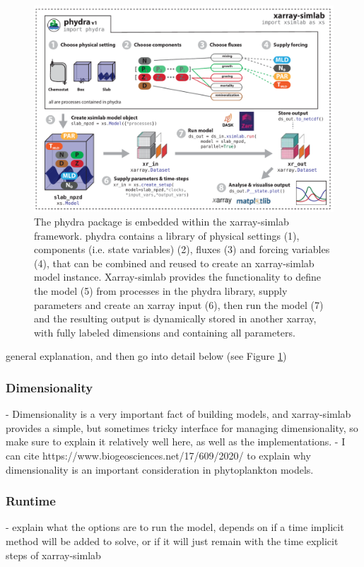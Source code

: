 \documentclass[template.tex]{subfiles}
\begin{document}
%
\begin{figure}[t]
\includegraphics[width=12cm]{Figures/firstdraft_schematics/01__schematics_phydra_1.pdf}
\caption{The phydra package is embedded within the xarray-simlab framework. phydra contains a library of physical settings (1), components (i.e. state variables) (2), fluxes (3) and forcing variables (4), that can be combined and reused to create an xarray-simlab model instance. Xarray-simlab provides the functionality to define the model (5) from processes in the phydra library, supply parameters and create an xarray input (6), then run the model (7) and the resulting output is dynamically stored in another xarray, with fully labeled dimensions and containing all parameters.}
\label{phydraschematics}
\end{figure}

general explanation, and then go into detail below (see Figure \ref{phydraschematics})

\subsubsection{Dimensionality}
- Dimensionality is a very important fact of building models, and xarray-simlab provides a simple, but sometimes tricky interface for managing dimensionality, so make sure to explain it relatively well here, as well as the implementations.
- I can cite https://www.biogeosciences.net/17/609/2020/ to explain why dimensionality is an important consideration in phytoplankton models.

\subsubsection{Runtime}
- explain what the options are to run the model, depends on if a time implicit method will be added to solve, or if it will just remain with the time explicit steps of xarray-simlab
\end{document}
